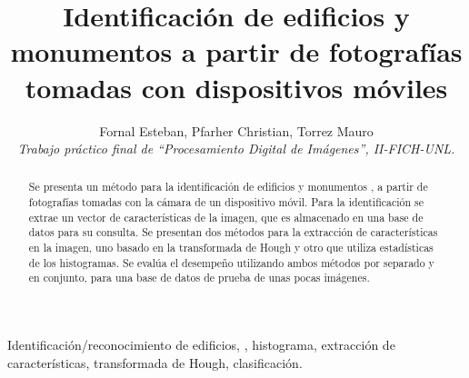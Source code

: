 \documentclass[conference,spanish,a4paper,10pt,oneside,final]{tfmpd}
\begin{document}
\title{Identificación de edificios y monumentos a partir de fotografías
tomadas con dispositivos móviles}
\author{Fornal Esteban, Pfarher Christian, Torrez Mauro\\
\textit{Trabajo práctico final de ``Procesamiento Digital de
Imágenes'', II-FICH-UNL.}}
\maketitle
%
%
%
%
\begin{abstract}
Se presenta un método para la identificación de edificios y monumentos , a
partir de fotografías tomadas con la cámara de un dispositivo móvil.
Para la identificación se extrae un vector de características de la imagen,
que es almacenado en una base de datos para su consulta.
Se presentan dos métodos para la extracción de características en la imagen, uno
basado en la transformada de Hough y otro que utiliza estadísticas de los
histogramas. Se evalúa el desempeño utilizando ambos métodos por separado y en
conjunto, para una base de datos de prueba de unas pocas imágenes.
\end{abstract}
%
%
%
%
\begin{keywords}
Identificación/reconocimiento de edificios, ,
histograma, extracción de características, transformada de Hough, clasificación.
\end{keywords}
\nocite{*}


\end{document}
